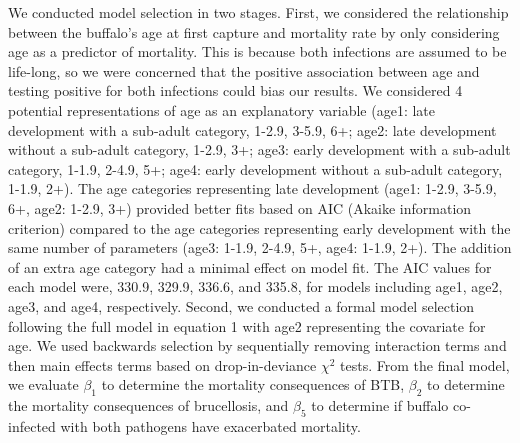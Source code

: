 \documentclass[11pt]{article}
\begin{document}
We conducted model selection in two stages. First, we considered the relationship between the buffalo's age at first capture and mortality rate by only considering age as a predictor of mortality. This is because both infections are assumed to be life-long, so we were concerned that the positive association between age and testing positive for both infections could bias our results. We considered 4 potential representations of age as an explanatory variable (age1: late development with a sub-adult category, 1-2.9, 3-5.9, 6+; age2: late development without a sub-adult category, 1-2.9, 3+; age3: early development with a sub-adult category, 1-1.9, 2-4.9, 5+; age4: early development without a sub-adult category, 1-1.9, 2+). The age categories representing late development (age1: 1-2.9, 3-5.9, 6+, age2: 1-2.9, 3+) provided better fits based on AIC (Akaike information criterion) compared to the age categories representing early development with the same number of parameters (age3: 1-1.9, 2-4.9, 5+, age4: 1-1.9, 2+). The addition of an extra age category had a minimal effect on model fit. The AIC values for each model were, 330.9, 329.9, 336.6, and 335.8, for models including age1, age2, age3, and age4, respectively. Second, we conducted a formal model selection following the full model in equation 1 with age2 representing the covariate for age. We used backwards selection by sequentially removing interaction terms and then main effects terms based on drop-in-deviance $\chi^2$ tests. From the final model, we evaluate $\beta_1$ to determine the mortality consequences of BTB, $\beta_2$ to determine the mortality consequences of brucellosis, and $\beta_5$ to determine if buffalo co-infected with both pathogens have exacerbated mortality.
\end{document}
